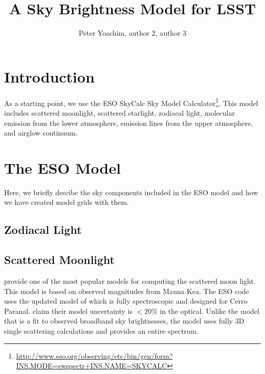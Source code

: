 \documentclass{emulateapj}  %
\begin{document}
\title{A Sky Brightness Model for LSST}


\author{Peter Yoachim, author 2, author 3}


\begin{abstract}

\end{abstract}


\section{Introduction}

As a starting point, we use the ESO SkyCalc Sky Model Calculator\footnote{\url{http://www.eso.org/observing/etc/bin/gen/form?INS.MODE=swspectr+INS.NAME=SKYCALC}}.  This model includes scattered moonlight, scattered starlight, zodiacal light, molecular emission from the lower atmosphere, emission lines from the upper atmosphere, and airglow continuum.  


\section{The ESO Model}
Here, we briefly descibe the sky components included in the ESO model and how we have created model grids with them.



\subsection{Zodiacal Light}


\subsection{Scattered Moonlight}

\citet{Krisciunas91} provide one of the most popular models for computing the scattered moon light. This model is based on observed magnitudes from Mauna Kea. The ESO code uses the updated model of \citet{Jones13} which is fully spectroscopic and designed for Cerro Paranal. \citet{Jones13} claim their model uncertainty is $<20$\% in the optical.  Unlike the \citet{Krisciunas91} model that is a fit to observed broadband sky brightnesses, the \citet{Jones13} model uses fully 3D single scattering calculations and provides an entire spectrum.

\citet{Noll12}
\end{document}
